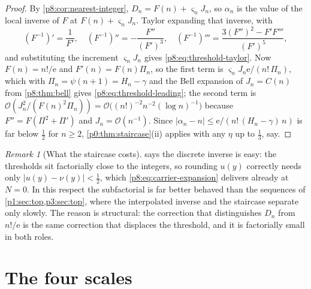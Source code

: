 \documentclass[11pt,a4paper,oneside]{book}
\theoremstyle{plain}
\theoremstyle{definition}
\theoremstyle{remark}
\newtheorem{remark}[theorem]{Remark}
\newcommand{\e}{\mathrm{e}}
\newcommand{\bigO}{\mathcal{O}}
\begin{document}
\begin{proof}
By \cref{p8:cor:nearest-integer}, $D_n=F(n)+\varsigma_nJ_n$, so $\alpha_n$ is
the value of the local inverse of $F$ at $F(n)+\varsigma_nJ_n$.  Taylor
expanding that inverse, with
\[
 (F^{-1})'=\frac1{F'},\quad
 (F^{-1})''=-\frac{F''}{(F')^{3}},\quad
 (F^{-1})'''=\frac{3(F'')^{2}-F'F'''}{(F')^{5}},
\]
and substituting the increment $\varsigma_nJ_n$ gives
\eqref{p8:eq:threshold-taylor}.  Now $F(n)=n!/\e$ and $F'(n)=F(n)\Pi_n$, so
the first term is $\varsigma_nJ_n\e/(n!\,\Pi_n)$, which with
$\Pi_n=\psi(n+1)=H_n-\gamma$ and the Bell expansion of $J_n=C(n)$ from
\cref{p8:thm:bell} gives \eqref{p8:eq:threshold-leading}; the second term is
$\bigO(J_n^{2}/(F(n)^{2}\Pi_n))=\bigO\bigl((n!)^{-2}n^{-2}(\log n)^{-1}\bigr)$
because $F''=F(\Pi^{2}+\Pi')$ and $J_n=\bigO(n^{-1})$.  Since
$|\alpha_n-n|\le\e/(n!\,(H_n-\gamma)\,n)$ is far below $\tfrac12$ for $n\ge2$,
\cref{p0:thm:staircase}(ii) applies with any $\eta$ up to $\tfrac13$, say.
\end{proof}

\begin{remark}[What the staircase costs]\label{p8:rem:staircase-cost}
 says the discrete inverse is easy: the thresholds sit
factorially close to the integers, so rounding $u(y)$ correctly needs only
$|u(y)-\nu(y)|<\tfrac12$, which \eqref{p8:eq:carrier-expansion} delivers
already at $N=0$.  In this respect the subfactorial is far better behaved than
the sequences of \cref{p1:sec:top,p3:sec:top}, where the interpolated inverse
and the staircase separate only slowly.  The reason is structural: the
correction that distinguishes $D_n$ from $n!/\e$ is the same correction that
displaces the threshold, and it is factorially small in both roles.
\end{remark}

\section{The four scales}
\label{p8:sec:hierarchy}
\end{document}
